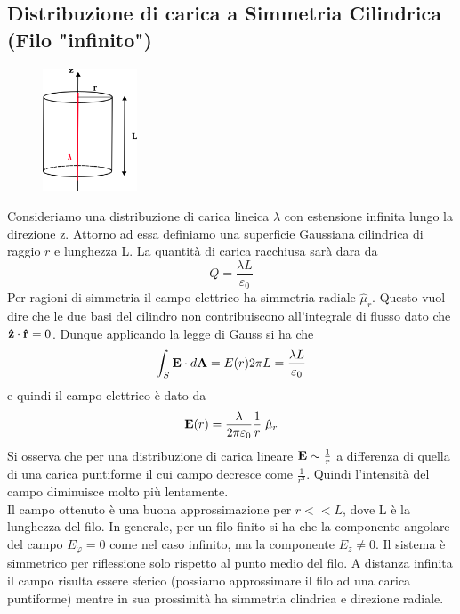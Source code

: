 \subsection{Distribuzione di carica a Simmetria Cilindrica (Filo "infinito")}

\begin{figure}  %
    \centering
    \includegraphics[width=0.25\textwidth]{images/wire}  %
\end{figure}

Consideriamo una distribuzione di carica lineica $\lambda$ con estensione infinita lungo la direzione z. Attorno ad essa definiamo una superficie Gaussiana cilindrica di raggio $r$ e lunghezza L. La quantit\`a di carica racchiusa sar\`a dara da 
\begin{equation*}
	Q = \frac{\lambda L }{\varepsilon_0}
\end{equation*}
Per ragioni di simmetria il campo elettrico ha simmetria radiale $\hat{\mu}_{r}$. Questo vuol dire che le due basi del cilindro non contribuiscono all'integrale di flusso dato che $\bold{\hat{z}} \cdot \bold{\hat{r}} = 0$. Dunque applicando la legge di Gauss si ha che 
\begin{equation*}
	\int_{S}\bold{E} \cdot d\bold{A} = E(r)2\pi L = \frac{\lambda L}{\varepsilon_0}
\end{equation*}
e quindi il campo elettrico \`e dato da 
\begin{equation}
	\bold{E}(r) = \frac{\lambda}{2\pi \varepsilon_0}\frac{1}{r} \; \hat{\mu}_{r}
\end{equation}
Si osserva che per una distribuzione di carica lineare $\bold{E} \sim \frac{1}{r}$ a differenza di quella di una carica puntiforme il cui campo decresce come $\frac{1}{r^2}$. Quindi l'intensit\`a del campo diminuisce molto pi\`u lentamente.
\\

\noindent Il campo ottenuto \`e una buona approssimazione per $r << L$, dove L \`e la lunghezza del filo. In generale, per un filo finito si ha che la componente angolare del campo $E_{\varphi} = 0$ come nel caso infinito, ma la componente $E_{z} \neq 0$. Il sistema \`e simmetrico per riflessione solo rispetto al punto medio del filo. A distanza infinita il campo risulta essere sferico (possiamo approssimare il filo ad una carica puntiforme) mentre in sua prossimit\`a ha simmetria clindrica e direzione radiale.

